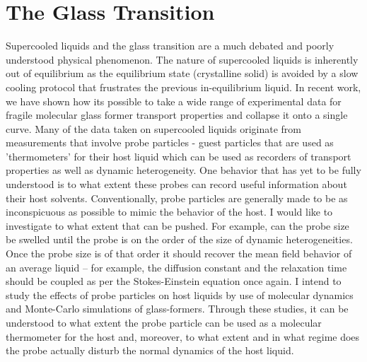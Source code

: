 \documentclass[11pt]{article}
\begin{document}
\section{The Glass Transition}
Supercooled liquids and the glass transition are a much debated and poorly understood physical phenomenon.  The nature of supercooled liquids is inherently out of equilibrium as the equilibrium state (crystalline solid) is avoided by a slow cooling protocol that frustrates the previous in-equilibrium liquid.  In recent work, we have shown how its possible to take a wide range of experimental data for fragile molecular glass former transport properties and collapse it onto a single curve. Many of the data taken on supercooled liquids originate from measurements that involve probe particles - guest particles that are used as 'thermometers' for their host liquid which can be used as recorders of transport properties as well as dynamic heterogeneity.  One behavior that has yet to be fully understood is to what extent these probes can record useful information about their host solvents.  Conventionally, probe particles are generally made to be as inconspicuous as possible to mimic the behavior of the host.  I would like to investigate to what extent that can be pushed.  For example, can the probe size be swelled until the probe is on the order of the size of dynamic heterogeneities.   Once the probe size is of that order it should recover the mean field behavior of an average liquid -- for example, the diffusion constant and the relaxation time should be coupled as per the Stokes-Einstein equation once again. I intend to study the effects of probe particles on host liquids by use of molecular dynamics and Monte-Carlo simulations of glass-formers.  Through these studies, it can be understood to what extent the probe particle can be used as a molecular thermometer for the host and, moreover, to what extent and in what regime does the probe actually disturb the normal dynamics of the host liquid.  
\end{document}
